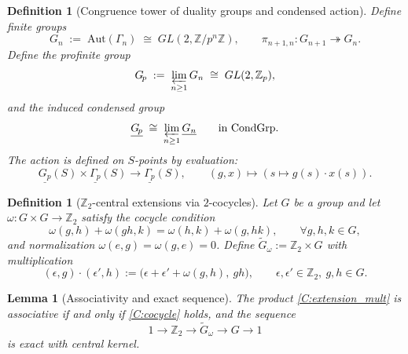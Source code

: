 \documentclass[11pt]{article}
\newtheorem{lemma}[theorem]{Lemma}
\newtheorem{definition}[theorem]{Definition}
\theoremstyle{remark}
\begin{document}
\begin{definition}[Congruence tower of duality groups and condensed action]
Define finite groups
\begin{equation}
G_{n}\;:=\;\mathrm{Aut}(\Gamma_{n})\;\cong\;GL(2,\mathbb Z/p^{n}\mathbb Z),
\qquad
\pi_{n+1,n}:G_{n+1}\twoheadrightarrow G_{n}.
\label{C:Gn}
\end{equation}
Define the profinite group
\begin{equation}
G_{\!p}\;:=\;\varprojlim_{n\ge 1}G_{n}\;\cong\;GL(2,\mathbb Z_{p}),
\label{C:Gp}
\end{equation}
and the induced condensed group
\begin{equation}
\underline{G_{\!p}}\;\cong\;\varprojlim_{n\ge 1}\underline{G_{n}}
\qquad \text{in }\mathrm{CondGrp}.
\label{C:Gp_cond}
\end{equation}
The action is defined on $S$-points by evaluation:
\begin{equation}
\underline{G_{\!p}}(S)\times \underline{\Gamma_{\!p}}(S)\to \underline{\Gamma_{\!p}}(S),
\qquad
(g,x)\mapsto (s\mapsto g(s)\cdot x(s)).
\label{C:cond_action}
\end{equation}
\end{definition}
\begin{definition}[$\mathbb Z_{2}$-central extensions via $2$-cocycles]
Let $G$ be a group and let $\omega:G\times G\to \mathbb Z_{2}$ satisfy the cocycle condition
\begin{equation}
\omega(g,h)+\omega(gh,k)=\omega(h,k)+\omega(g,hk),
\qquad \forall g,h,k\in G,
\label{C:cocycle}
\end{equation}
and normalization $\omega(e,g)=\omega(g,e)=0$.
Define $\widetilde{G}_{\omega}:=\mathbb Z_{2}\times G$ with multiplication
\begin{equation}
(\epsilon,g)\cdot(\epsilon',h)
:=
\bigl(\epsilon+\epsilon'+\omega(g,h),\ gh\bigr),
\qquad \epsilon,\epsilon'\in\mathbb Z_{2},\ g,h\in G.
\label{C:extension_mult}
\end{equation}
\end{definition}

\begin{lemma}[Associativity and exact sequence]
\label{C:extension_exact}
The product \eqref{C:extension_mult} is associative if and only if \eqref{C:cocycle} holds, and the sequence
\begin{equation}
1\longrightarrow \mathbb Z_{2}\longrightarrow \widetilde{G}_{\omega}\longrightarrow G\longrightarrow 1
\label{C:central_ext}
\end{equation}
is exact with central kernel.
\end{lemma}
\end{document}
